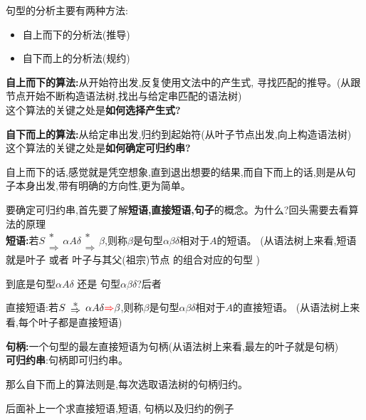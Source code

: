 \documentclass[UTF8,a4paper]{ctexart}
\newcommand{\spaceline}{\vspace{\baselineskip}}
\begin{document}
  句型的分析主要有两种方法:
  \begin{itemize}
    \item 自上而下的分析法(推导)
    \item 自下而上的分析法(规约)
  \end{itemize}

  \textbf{自上而下的算法:}从开始符出发,反复使用文法中的产生式,
  寻找匹配的推导。(从跟节点开始不断构造语法树,找出与给定串匹配的语法树)\\
  这个算法的关键之处是\textbf{如何选择产生式?}

  \spaceline
  \textbf{自下而上的算法:}从给定串出发,归约到起始符(从叶子节点出发,向上构造语法树)\\
  这个算法的关键之处是\textbf{如何确定可归约串?}

  自上而下的话,感觉就是凭空想象,直到退出想要的结果,而自下而上的话,则是从句子本身出发,带有明确的方向性,更为简单。

  \spaceline
  要确定可归约串,首先要了解\textbf{短语,直接短语,句子}的概念。{\color{red}为什么?回头需要去看算法的原理}\\
  \textbf{短语:}若$\renewcommand{\arraystretch}{0.5}S\begin{array}{c} * \\ \Rightarrow \end{array} \alpha A\delta
  \begin{array}{c} * \\ \Rightarrow \end{array} \beta$,则称$\beta$是句型{\color{red}$\alpha \beta \delta$}相对于$A$的短语。
    (从语法树上来看,短语就是叶子 或者 叶子与其父(祖宗)节点 的组合对应的句型 )

  {\color{blue}到底是句型$\alpha A \delta$ 还是 句型$\alpha \beta \delta$?后者}

  直接短语:若$\renewcommand{\arraystretch}{0.5}S\begin{array}{c} * \\ \Rightarrow \end{array} \alpha A\delta
   {\color{red}\Rightarrow}  \beta$,则称$\beta$是句型{\color{red}$\alpha \beta \delta$}相对于$A$的直接短语。
   (从语法树上来看,每个叶子都是直接短语)

   \textbf{句柄:}一个句型的最左直接短语为句柄(从语法树上来看,最左的叶子就是句柄)\\
   \textbf{可归约串}:句柄即可归约串。

   那么自下而上的算法则是,每次选取语法树的句柄归约。

   {\color{red} 后面补上一个求直接短语,短语, 句柄以及归约的例子}
\end{document}
